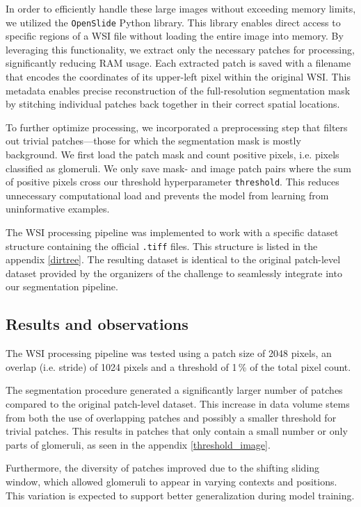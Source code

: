 \documentclass[12pt]{article}
\begin{document}
In order to efficiently handle these large images without exceeding memory limits, we utilized the \texttt{OpenSlide} Python library. This library enables direct access to specific regions of a WSI file without loading the entire image into memory. By leveraging this functionality, we extract only the necessary patches for processing, significantly reducing RAM usage. Each extracted patch is saved with a filename that encodes the coordinates of its upper-left pixel within the original WSI. This metadata enables precise reconstruction of the full-resolution segmentation mask by stitching individual patches back together in their correct spatial locations.

To further optimize processing, we incorporated a preprocessing step that filters out trivial patches---those for which the segmentation mask is mostly background. We first load the patch mask and count positive pixels, i.e. pixels classified as glomeruli. We only save mask- and image patch pairs where the sum of positive pixels cross our threshold hyperparameter \texttt{threshold}. This reduces unnecessary computational load and prevents the model from learning from uninformative examples.

The WSI processing pipeline was implemented to work with a specific dataset structure containing the official \texttt{.tiff} files. This structure is listed in the appendix \ref{dirtree}. The resulting dataset is identical to the original patch-level dataset provided by the organizers of the challenge to seamlessly integrate into our segmentation pipeline.

\subsection{Results and observations}
The WSI processing pipeline was tested using a patch size of 2048 pixels, an overlap (i.e. stride) of 1024 pixels and a threshold of 1\,\% of the total pixel count.

The segmentation procedure generated a significantly larger number of patches compared to the original patch-level dataset. This increase in data volume stems from both the use of overlapping patches and possibly a smaller threshold for trivial patches. This results in patches that only contain a small number or only parts of glomeruli, as seen in the appendix \ref{threshold_image}.

Furthermore, the diversity of patches improved due to the shifting sliding window, which allowed glomeruli to appear in varying contexts and positions. This variation is expected to support better generalization during model training.
\end{document}
